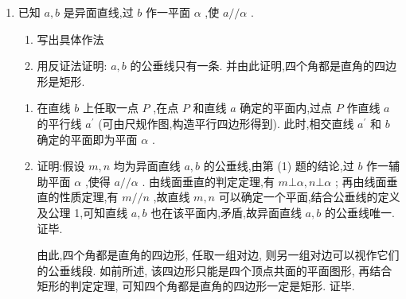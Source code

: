 \begin{enumerate}
\begin{jieda}
        下面说明轨迹上的每一点都能取到. 在平面 ${QR}{R}_{1}{Q}_{1}$ 中,以 $Q$ 为圆心, ${QC} = \sqrt{{m}^{2} - {h}^{2}}$ 为半径的圆周上的每一点 $C$ ,作 ${CA} \bot  a$ 于点 $A$ ,并取 $\vv{PB} = \vv{AC}$ ,则 ${AB} = {PC} = \sqrt{P{Q}^{2} + Q{C}^{2}} = \sqrt{{h}^{2} + \left( {{m}^{2} - {h}^{2}}\right) } = m$ . $\bigtriangleup {PQC}$ 中, ${MT}$ 仍是 ${CQ}$ 对应的中位线,即每一点 $C$ 对应一个 $\vv{TM} = \dfrac{1}{2} \cdot  \vv{QC}$ . 综上,点 $M$ 的轨迹是以 ${PQ}$ 的中点 $T$ 为圆心、半径为 $\dfrac{1}{2} \cdot  \sqrt{{m}^{2} - {h}^{2}}$ ,并位于 ${PQ}$ 的垂直平分面上的圆.
    \end{jieda}
    \item 已知 $a,b$ 是异面直线,过 $b$ 作一平面 $\alpha$ ,使 $a//\alpha$ .
    \begin{enumerate}
        \item 写出具体作法
        \item 用反证法证明: $a,b$ 的公垂线只有一条. 并由此证明,四个角都是直角的四边形是矩形.
    \end{enumerate}
    \begin{jieda}
        \begin{enumerate}
            \item 在直线 $b$ 上任取一点 $P$ ,在点 $P$ 和直线 $a$ 确定的平面内,过点 $P$ 作直线 $a$ 的平行线 ${a}^{\prime }$ (可由尺规作图,构造平行四边形得到). 此时,相交直线 ${a}^{\prime }$ 和 $b$ 确定的平面即为平面 $\alpha$ .
            \item 证明:假设 $m,n$ 均为异面直线 $a,b$ 的公垂线,由第 (1) 题的结论,过 $b$ 作一辅助平面 $\alpha$ ,使得 $a//\alpha$ . 由线面垂直的判定定理,有 $m\bot \alpha ,n\bot \alpha$ ; 再由线面垂直的性质定理,有 $m//n$ ,故直线 $m,n$ 可以确定一个平面,结合公垂线的定义及公理 1,可知直线 $a,b$ 也在该平面内,矛盾,故异面直线 $a,b$ 的公垂线唯一. 证毕.

            由此,四个角都是直角的四边形, 任取一组对边, 则另一组对边可以视作它们的公垂线段. 如前所述, 该四边形只能是四个顶点共面的平面图形, 再结合矩形的判定定理, 可知四个角都是直角的四边形一定是矩形. 证毕.
        \end{enumerate}
    \end{jieda}
\end{enumerate}